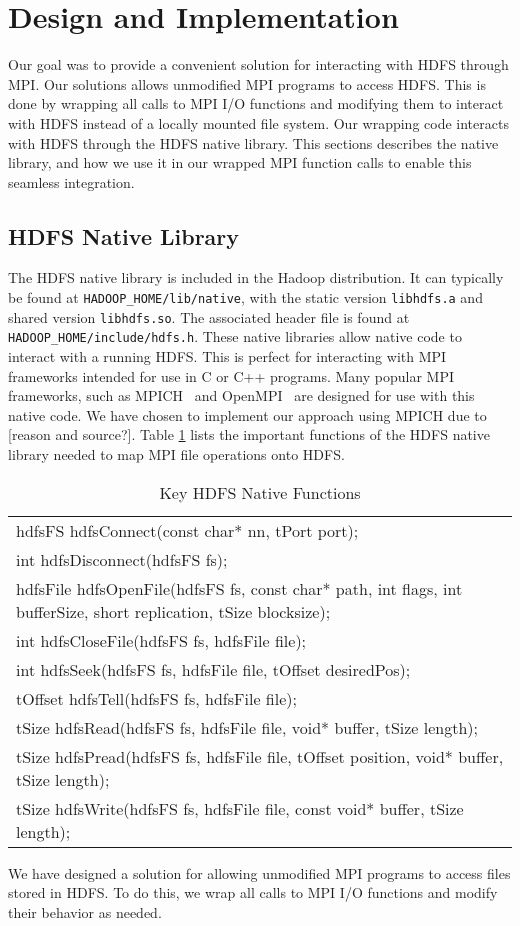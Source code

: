 \section{Design and Implementation}
Our goal was to provide a convenient solution for interacting with HDFS through MPI. Our solutions allows unmodified MPI programs to access HDFS. This is done by wrapping all calls to MPI I/O functions and modifying them to interact with HDFS instead of a locally mounted file system. Our wrapping code interacts with HDFS through the HDFS native library. This sections describes the native library, and how we use it in our wrapped MPI function calls to enable this seamless integration.

\subsection{HDFS Native Library}
The HDFS native library is included in the Hadoop distribution. It can typically be found at \texttt{HADOOP\_HOME/lib/native}, with the static version \texttt{libhdfs.a} and shared version \texttt{libhdfs.so}. The associated header file is found at \texttt{HADOOP\_HOME/include/hdfs.h}. These native libraries allow native code to interact with a running HDFS. This is perfect for interacting with MPI frameworks intended for use in C or C++ programs. Many popular MPI frameworks, such as MPICH~\cite{mpich} and OpenMPI~\cite{openmpi} are designed for use with this native code. We have chosen to implement our approach using MPICH due to [reason and source?]. Table \ref{table:libhdfs} lists the important functions of the HDFS native library needed to map MPI file operations onto HDFS.


\begin{table}[ht]
\caption{Key HDFS Native Functions}
{\ttfamily
\begin{tabular}{l}
\hline\hline
hdfsFS hdfsConnect(const char* nn, tPort port); \\
int hdfsDisconnect(hdfsFS fs); \\
hdfsFile hdfsOpenFile(hdfsFS fs, const char* path, int flags,
                          int bufferSize, short replication, tSize blocksize); \\
int hdfsCloseFile(hdfsFS fs, hdfsFile file); \\
int hdfsSeek(hdfsFS fs, hdfsFile file, tOffset desiredPos); \\
tOffset hdfsTell(hdfsFS fs, hdfsFile file); \\
tSize hdfsRead(hdfsFS fs, hdfsFile file, void* buffer, tSize length); \\
tSize hdfsPread(hdfsFS fs, hdfsFile file, tOffset position,
                    void* buffer, tSize length); \\
tSize hdfsWrite(hdfsFS fs, hdfsFile file, const void* buffer,
                    tSize length); \\
\hline\hline
\end{tabular}
}
\label{table:libhdfs}
\end{table}
					

We have designed a solution for allowing unmodified MPI programs to access files stored in HDFS. To do this, we wrap all calls to MPI I/O functions and modify their behavior as needed. 